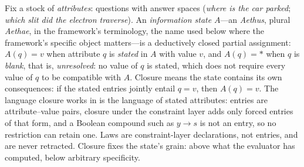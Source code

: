 Fix a stock of \emph{attributes}: questions with answer spaces (\emph{where is the car parked}; \emph{which slit did the electron traverse}). An \emph{information state} $A$---an \emph{Aethus}, plural \emph{Aethae}, in the framework's terminology, the name used below where the framework's specific object matters---is a deductively closed partial assignment: $A(q) = v$ when attribute $q$ is \emph{stated} in $A$ with value $v$, and $A(q) = \ast$ when $q$ is \emph{blank}, that is, \emph{unresolved}: no value of $q$ is stated, which does not require every value of $q$ to be compatible with $A$. Closure means the state contains its own consequences: if the stated entries jointly entail $q = v$, then $A(q) = v$. The language closure works in is the language of stated attributes: entries are attribute--value pairs, closure under the constraint layer adds only forced entries of that form, and a Boolean compound such as $y \rightarrow s$ is not an entry, so no restriction can retain one. Laws are constraint-layer declarations, not entries, and are never retracted. Closure fixes the state's grain: above what the evaluator has computed, below arbitrary specificity.

